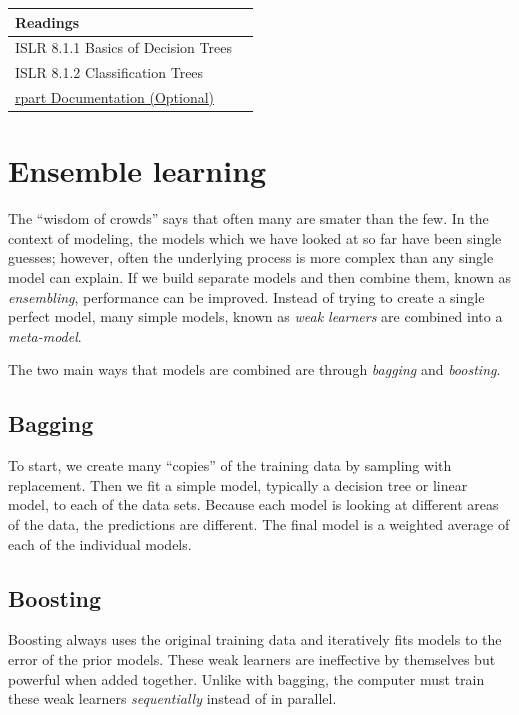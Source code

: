 \documentclass[openany]{book}
\begin{document}
\begin{longtable}[]{@{}ll@{}}
\toprule
Readings &\tabularnewline
\midrule
\endhead
ISLR 8.1.1 Basics of Decision Trees &\tabularnewline
ISLR 8.1.2 Classification Trees &\tabularnewline
\href{https://cran.r-project.org/web/packages/rpart/vignettes/longintro.pdf}{rpart Documentation (Optional)} &\tabularnewline
\bottomrule
\end{longtable}

\hypertarget{ensemble-learning}{%
\section{Ensemble learning}\label{ensemble-learning}}

The ``wisdom of crowds'' says that often many are smater than the few. In the context of modeling, the models which we have looked at so far have been single guesses; however, often the underlying process is more complex than any single model can explain. If we build separate models and then combine them, known as \emph{ensembling}, performance can be improved. Instead of trying to create a single perfect model, many simple models, known as \emph{weak learners} are combined into a \emph{meta-model}.

The two main ways that models are combined are through \emph{bagging} and \emph{boosting}.

\hypertarget{bagging}{%
\subsection{Bagging}\label{bagging}}

To start, we create many ``copies'' of the training data by sampling with replacement. Then we fit a simple model, typically a decision tree or linear model, to each of the data sets. Because each model is looking at different areas of the data, the predictions are different. The final model is a weighted average of each of the individual models.

\hypertarget{boosting}{%
\subsection{Boosting}\label{boosting}}

Boosting always uses the original training data and iteratively fits models to the error of the prior models. These weak learners are ineffective by themselves but powerful when added together. Unlike with bagging, the computer must train these weak learners \emph{sequentially} instead of in parallel.
\end{document}
